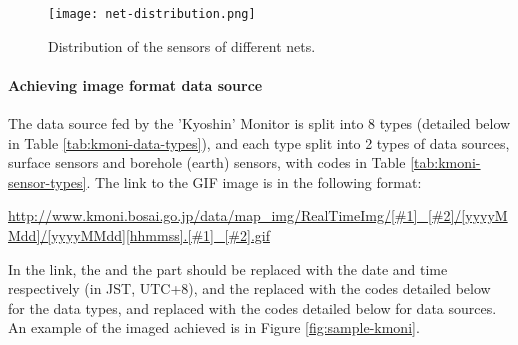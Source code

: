 \begin{figure}[!ht]
    \centering
    \texttt{[image: net-distribution.png]}
    \caption{Distribution of the sensors of different nets.}
    \label{fig:net-distribution}
\end{figure}



\paragraph{Achieving image format data source}

The data source fed by the 'Kyoshin' Monitor is split into 8 types (detailed below in Table \ref{tab:kmoni-data-types}), and each type split into 2 types of data sources, surface sensors and borehole (earth) sensors, with codes in Table \ref{tab:kmoni-sensor-types}. The link to the GIF image is in the following format:

\begin{center}
    \url{http://www.kmoni.bosai.go.jp/data/map_img/RealTimeImg/[#1]_[#2]/[yyyyMMdd]/[yyyyMMdd][hhmmss].[#1]_[#2].gif}
\end{center}

In the link, the \Code{[yyyyMMdd]} and the \Code{[hhmmss]} part should be replaced with the date and time respectively (in JST, UTC+8), and the  replaced with the codes detailed below for the data types, and  replaced with the codes detailed below for data sources. An example of the imaged achieved is in Figure \ref{fig:sample-kmoni}.

